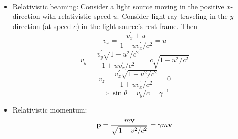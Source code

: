 \documentclass[12pt]{article}
\begin{document}
\begin{itemize}
\begin{eqnarray}
\end{eqnarray}
\item Relativistic beaming: Consider a light source moving in the positive $x$-direction with relativistic speed $u$. Consider light ray traveling in the $y$ direction (at speed $c$) in the light source's rest frame. Then
\begin{equation}
v_x = \frac{v_x^\prime + u}{1 - uv_x^\prime/c^2} = u
\end{equation}
\begin{equation}
v_y = \frac{v_y^\prime\sqrt{1-u^2/c^2}}{1+uv_x^\prime/c^2} = c\sqrt{1 - u^2/c^2}
\end{equation}
\begin{equation}
v_z = \frac{v_z^\prime\sqrt{1 - u^2/c^2}}{1 + u v_x^\prime/c^2} = 0
\end{equation}
\begin{equation}
\Longrightarrow \sin\theta = v_y/c = \gamma^{-1}
\end{equation}

\item Relativistic momentum:
\begin{equation}
{\bf p} = \frac{m{\bf v}}{\sqrt{1 - v^2/c^2}} = \gamma m {\bf v}
\end{equation}


\end{itemize}
\end{document}
